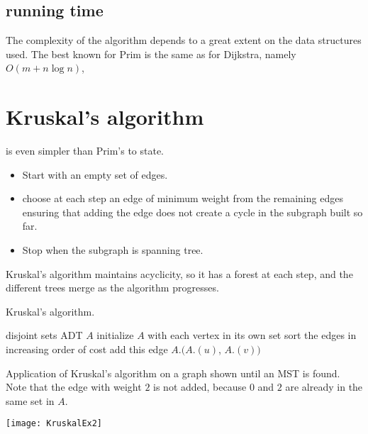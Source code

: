 \subsection{running time}

The complexity of the algorithm depends to a great extent on the data
structures used. The best known for Prim is the same as for Dijkstra,
namely $O(m + n\log n)$,

\section{Kruskal's algorithm}

 is even simpler than Prim's to state.
\begin{itemize}
\item Start with an empty set of edges.
\item choose at each step an edge of minimum weight from the remaining edges ensuring that adding the edge does not create a cycle in the subgraph built so
far. 
\item Stop when the subgraph is spanning tree.
\end{itemize}


Kruskal's algorithm maintains acyclicity, so it has a forest
at each step, and the different trees merge as the algorithm progresses.


\begin{algorithm}[H]
  \caption{Kruskal's algorithm.}
  \label{alg:kruskal}
\begin{algorithmic}[1]
	\State disjoint sets ADT $A$
	\State initialize $A$ with each vertex in its own set
	\State sort the edges in increasing order of cost
			\State add this edge
			\State $A$.$(A$.$(u)$, $A$.$(v))$
		\EndIf
	\EndFor
	\State {}
\EndFunction
\end{algorithmic}
\end{algorithm}

\begin{Boxample}
Application of Kruskal's algorithm on a graph shown until an MST is found. 
Note that the edge  with weight $2$ is not added, 
because $0$ and $2$ are already in the same set in $A$.
\begin{center}
\texttt{[image: KruskalEx2]}
\end{center}
\end{Boxample}



